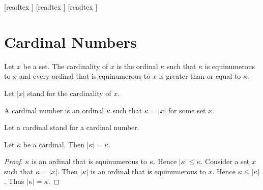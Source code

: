 \documentclass[10pt]{article}
\begin{document}
  \begin{imports}
    \begin{forthel}
      [readtex ]
      [readtex ]
      [readtex ]
    \end{forthel}
  \end{imports}


  \section*{Cardinal Numbers}

  \begin{forthel}
    \begin{definition}
      Let $x$ be a set.
      The cardinality of $x$ is the ordinal $\kappa$ such that $\kappa$ is equinumerous to $x$ and every ordinal that is equinumerous to $x$ is greater than or equal to $\kappa$.
    \end{definition}

    Let $|x|$ stand for the cardinality of $x$.
  \end{forthel}

  \begin{forthel}
    \begin{definition}
      A cardinal number is an ordinal $\kappa$ such that $\kappa = |x|$ for some
      set $x$.
    \end{definition}

    Let a cardinal stand for a cardinal number.
  \end{forthel}

  \begin{forthel}
    \begin{proposition}
      Let $\kappa$ be a cardinal.
      Then $|\kappa| = \kappa$.
    \end{proposition}
    \begin{proof}
      $\kappa$ is an ordinal that is equinumerous to $\kappa$.
      Hence $|\kappa| \leq \kappa$.
      Consider a set $x$ such that $\kappa = |x|$.
      Then $|\kappa|$ is an ordinal that is equinumerous to $x$.
      Hence $\kappa \leq |\kappa|$.
      Thus $|\kappa| = \kappa$.
    \end{proof}
  \end{forthel}
\end{document}

